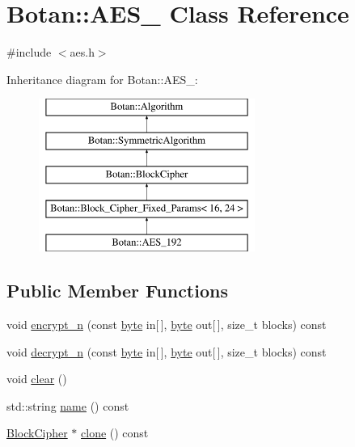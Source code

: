 \hypertarget{classBotan_1_1AES__192}{\section{Botan\-:\-:A\-E\-S\-\_ Class Reference}
\label{classBotan_1_1AES__192}
}


{\ttfamily \#include $<$aes.\-h$>$}

Inheritance diagram for Botan\-:\-:A\-E\-S\-\_\-:\begin{figure}[H]
\begin{center}
\leavevmode
\includegraphics[height=5.000000cm]{classBotan_1_1AES__192}
\end{center}
\end{figure}
\subsection*{Public Member Functions}
\begin{DoxyCompactItemize}
\item 
void \hyperlink{classBotan_1_1AES__192_a3c5e70db050dfc645d846f96d1e90d30}{encrypt\-\_\-n} (const \hyperlink{namespaceBotan_a7d793989d801281df48c6b19616b8b84}{byte} in\mbox{[}$\,$\mbox{]}, \hyperlink{namespaceBotan_a7d793989d801281df48c6b19616b8b84}{byte} out\mbox{[}$\,$\mbox{]}, size\-\_\-t blocks) const 
\item 
void \hyperlink{classBotan_1_1AES__192_a69c6a2e95cee6f0fd4aaf5dbb7cf9fa3}{decrypt\-\_\-n} (const \hyperlink{namespaceBotan_a7d793989d801281df48c6b19616b8b84}{byte} in\mbox{[}$\,$\mbox{]}, \hyperlink{namespaceBotan_a7d793989d801281df48c6b19616b8b84}{byte} out\mbox{[}$\,$\mbox{]}, size\-\_\-t blocks) const 
\item 
void \hyperlink{classBotan_1_1AES__192_a201f6e8a39fc74fa90abd659c18dcf2b}{clear} ()
\item 
std\-::string \hyperlink{classBotan_1_1AES__192_a58091bfdd7e0d4146af36da6aa5259db}{name} () const 
\item 
\hyperlink{classBotan_1_1BlockCipher}{Block\-Cipher} $\ast$ \hyperlink{classBotan_1_1AES__192_a168e8386d5dabb3322f41adee697ff5a}{clone} () const 
\end{DoxyCompactItemize}
